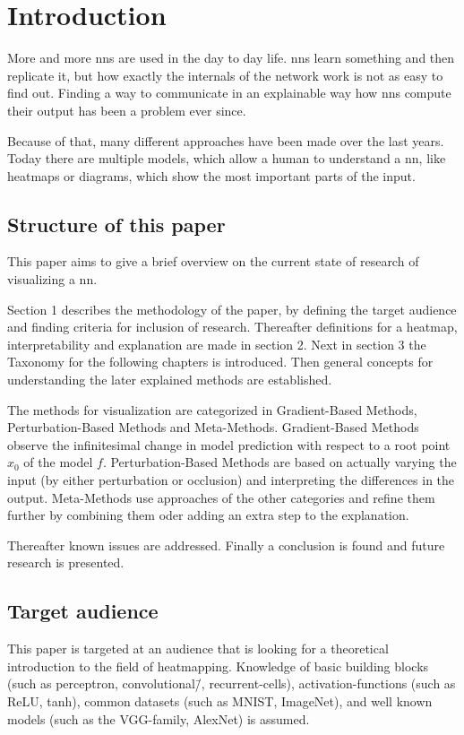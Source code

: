 \section{Introduction}
More and more \glspl{nn} are used in the day to day life. \glspl{nn} learn something and then replicate it, but how exactly the internals of the network work is not as easy to find out. Finding a way to communicate in an explainable way how \glspl{nn} compute their output has been a problem ever since. 
\par 
Because of that, many different approaches have been made over the last years. Today there are multiple models, which allow a human to understand a \gls{nn}, like heatmaps or diagrams, which show the most important parts of the input.

\subsection{Structure of this paper}
This paper aims to give a brief overview on the current state of research of visualizing a \gls{nn}. 
\par 
Section 1 describes the methodology of the paper, by defining the target audience and finding criteria for inclusion of research. Thereafter definitions for a heatmap, interpretability and explanation are made in section 2. Next in section 3 the Taxonomy for the following chapters is introduced. Then general concepts for understanding the later explained methods are established.
\par
The methods for visualization are categorized in Gradient-Based Methods, Perturbation-Based Methods and Meta-Methods.
Gradient-Based Methods observe the infinitesimal change in model prediction with respect to a root point \(x_0\) of the model \(f\).
Perturbation-Based Methods are based on actually varying the input (by either  perturbation or occlusion) and interpreting the differences in the output.
Meta-Methods use approaches of the other categories and refine them further by combining them oder adding an extra step to the explanation.
\par
Thereafter known issues are addressed.
Finally a conclusion is found and future research is presented.

\subsection{Target audience}
This paper is targeted at an audience that is looking for a theoretical introduction to the field of heatmapping. Knowledge of basic building blocks (such as perceptron, convolutional\=/, recurrent-cells), activation-functions (such as ReLU, tanh), common datasets (such as MNIST, ImageNet), and well known models (such as the VGG-family, AlexNet) is assumed.

